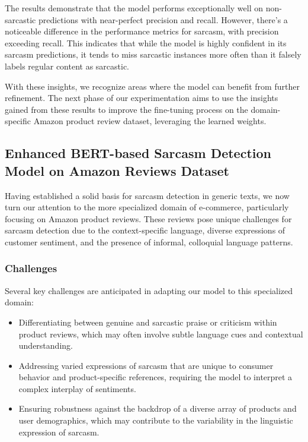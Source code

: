 \documentclass[10pt,twocolumn,letterpaper]{article}
\begin{document}
The results demonstrate that the model performs exceptionally well on non-sarcastic predictions with near-perfect precision and recall. However, there's a noticeable difference in the performance metrics for sarcasm, with precision exceeding recall. This indicates that while the model is highly confident in its sarcasm predictions, it tends to miss sarcastic instances more often than it falsely labels regular content as sarcastic.

With these insights, we recognize areas where the model can benefit from further refinement. The next phase of our experimentation aims to use the insights gained from these results to improve the fine-tuning process on the domain-specific Amazon product review dataset, leveraging the learned weights.

\subsection{Enhanced BERT-based Sarcasm Detection Model on Amazon Reviews Dataset}
Having established a solid basis for sarcasm detection in generic texts, we now turn our attention to the more specialized domain of e-commerce, particularly focusing on Amazon product reviews. These reviews pose unique challenges for sarcasm detection due to the context-specific language, diverse expressions of customer sentiment, and the presence of informal, colloquial language patterns.

\subsubsection{Challenges}
Several key challenges are anticipated in adapting our model to this specialized domain:

\begin{itemize}
    \item Differentiating between genuine and sarcastic praise or criticism within product reviews, which may often involve subtle language cues and contextual understanding.
    \item Addressing varied expressions of sarcasm that are unique to consumer behavior and product-specific references, requiring the model to interpret a complex interplay of sentiments.
    \item Ensuring robustness against the backdrop of a diverse array of products and user demographics, which may contribute to the variability in the linguistic expression of sarcasm.
\end{itemize}
\end{document}
